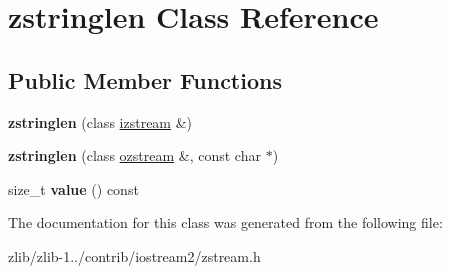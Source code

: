 \hypertarget{classzstringlen}{\section{zstringlen Class Reference}
\label{classzstringlen}
}
\subsection*{Public Member Functions}
\begin{DoxyCompactItemize}
\item 
\hypertarget{classzstringlen_ae616a813b06db3cabf2affabf3daab75}{{\bfseries zstringlen} (class \hyperlink{classizstream}{izstream} \&)}\label{classzstringlen_ae616a813b06db3cabf2affabf3daab75}

\item 
\hypertarget{classzstringlen_adc39dd75c544f35a3c56f74b405602d2}{{\bfseries zstringlen} (class \hyperlink{classozstream}{ozstream} \&, const char $\ast$)}\label{classzstringlen_adc39dd75c544f35a3c56f74b405602d2}

\item 
\hypertarget{classzstringlen_a5c5f9a73a5dee5b1dda579869e6a918d}{size\+\_\+t {\bfseries value} () const }\label{classzstringlen_a5c5f9a73a5dee5b1dda579869e6a918d}

\end{DoxyCompactItemize}


The documentation for this class was generated from the following file\+:\begin{DoxyCompactItemize}
\item 
zlib/zlib-\/1../contrib/iostream2/zstream.\+h\end{DoxyCompactItemize}
